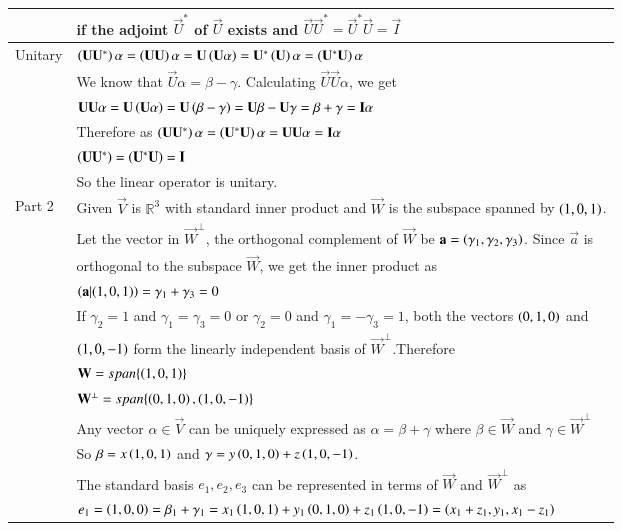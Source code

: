 \documentclass[journal,12pt]{IEEEtran}
\begin{document}
\begin{longtable}{|l|l|}
    &if the adjoint $\vec{U}^*$ of $\vec{U}$ exists and $\vec{U}\vec{U}^*=\vec{U}^*\vec{U}=\vec{I}$\\
    \hline
    Unitary& $\left(\mathbf{U}\mathbf{U}^*\right)\alpha=\left(\mathbf{U}\mathbf{U}\right)\alpha=\mathbf{U}\left(\mathbf{U}\alpha\right)=\mathbf{U}^*\left(\mathbf{U}\right)\alpha=\left(\mathbf{U}^*\mathbf{U}\right)\alpha$\\
    &We know that $\vec{U}\alpha=\beta
    -\gamma$. Calculating $\vec{U}\vec{U}\alpha$, we get\\
    &$\mathbf{U}\mathbf{U}\alpha=\mathbf{U}\left(\mathbf{U}\alpha\right)=\mathbf{U}\left(\beta-\gamma\right)=\mathbf{U}\beta-\mathbf{U}\gamma=\beta+\gamma=\mathbf{I}\alpha$\\
    & Therefore as $\left(\mathbf{U}\mathbf{U}^*\right)\alpha=\left(\mathbf{U}^*\mathbf{U}\right)\alpha=\mathbf{U}\mathbf{U}\alpha=\mathbf{I}\alpha$\\
    &\qquad\qquad $\left(\mathbf{U}\mathbf{U}^*\right)=\left(\mathbf{U}^*\mathbf{U}\right)=\mathbf{I}$\\
    &So the linear operator is unitary.\\
    \hline
    Part 2&Given $\vec{V}$ is $\mathbb{R}^3$ with standard inner product and $\vec{W}$ is the subspace spanned by $\left(1,0,1\right)$.\\
    &Let the vector in $\vec{W}^\perp$, the orthogonal complement of $\vec{W}$ be $\mathbf{a}=\left(\gamma_1, \gamma_2, \gamma_3\right)$. Since $\vec{a}$ is \\
    &orthogonal to the subspace $\vec{W}$, we get the inner product as\\
    &\qquad$\left(\mathbf{a}\vert(1,0,1)\right)=\gamma_1+\gamma_3=0$\\
    &If $\gamma_2=1$ and $\gamma_1=\gamma_3=0$ or $\gamma_2=0$ and $\gamma_1=-\gamma_3=1$, both the vectors $\left(0,1,0\right)$ and\\
    &$\left(1,0,-1\right)$ form the linearly independent basis of $\vec{W}^\perp$.Therefore\\
    &\qquad$\mathbf{W}=span\{\left(1,0,1\right)\}$\\
    &\qquad$\mathbf{W}^\perp=span\{\left(0,1,0\right),\left(1,0,-1\right)\}$\\
    &Any vector $\alpha\in\vec{V}$ can be uniquely expressed as $\alpha=\beta+\gamma$ where $\beta\in\vec{W}$ and $\gamma\in\vec{W}^\perp$\\
    &So $\beta=x\left(1,0,1\right)$ and $\gamma=y\left(0,1,0\right)+z\left(1,0,-1\right)$.\\
    &The standard basis $e_1,e_2,e_3$ can be represented in terms of $\vec{W}$ and $\vec{W}^\perp$ as\\
    &$e_1=\left(1,0,0\right)=\beta_1+\gamma_1=x_1\left(1,0,1\right)+y_1\left(0,1,0\right)+z_1\left(1,0,-1\right)=\left(x_1+z_1,y_1,x_1-z_1\right)$\\

\end{longtable}
\end{document}
